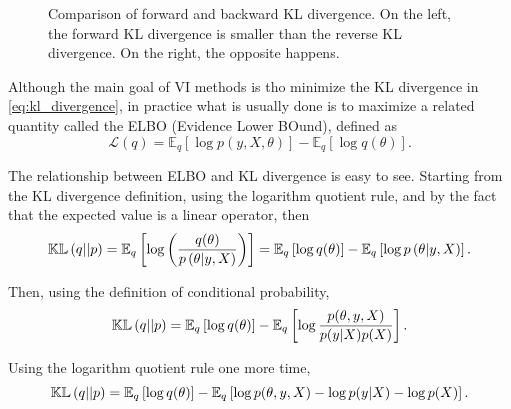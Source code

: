 \begin{figure}[H]
  \centering
  \hfill
  \caption{Comparison of forward and backward KL divergence. On the left, the forward KL divergence is smaller than the reverse KL divergence. On the right, the opposite happens.}
  \label{fig:KL_example}
\end{figure}



Although the main goal of VI methods is tho minimize the KL divergence in \ref{eq:kl_divergence}, in practice what is usually done is to maximize a related quantity called the ELBO (Evidence Lower BOund), defined as
\begin{equation}
  \label{eq:elbo_def}
  \mathcal{L}(q) = \mathbb{E}_q\left[ \log p(y, X, \theta) \right] - \mathbb{E}_q\left[ \log q(\theta) \right].
\end{equation}

The relationship between ELBO and KL divergence is easy to see. Starting from the KL divergence definition, using the logarithm quotient rule, and by the fact that the expected value is a linear operator, then
\begin{equation}
    \mathbb{KL}\left( q || p \right) =
    \mathbb{E}_q \left[ \log \left( \frac{q(\theta)}{p\left( \theta | y, X \right)} \right) \right] =
    \mathbb{E}_q \left[ \log  q(\theta) \right] - \mathbb{E}_q \left[ \log {p\left( \theta | y, X \right)}  \right].
\end{equation}

Then, using the definition of conditional probability,
\begin{equation}
    \mathbb{KL}\left( q || p \right) =
    \mathbb{E}_q \left[ \log  q(\theta) \right] - \mathbb{E}_q \left[ \log \frac{p(\theta, y, X)}{p(y | X) p(X)}  \right].
\end{equation}

Using the logarithm quotient rule one more time,
\begin{equation}
  \mathbb{KL}\left( q || p \right) =
  \mathbb{E}_q \left[ \log  q(\theta) \right] - \mathbb{E}_q \left[ \log p(\theta, y, X) - \log p(y | X) - \log p(X)  \right].
\end{equation}


